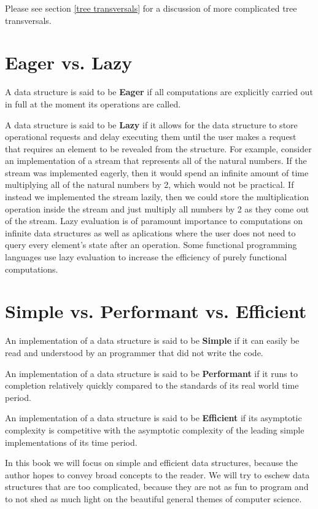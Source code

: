 \documentclass[12pt, letterpaper]{book}
\begin{document}
Please see section \ref{tree transversals} for a discussion of more complicated tree transversals.

\section{Eager vs. Lazy}

A data structure is said to be \textbf{Eager} if all computations are explicitly carried out in full at the moment its operations are called.

A data structure is said to be \textbf{Lazy} if it allows for the data structure to store operational requests and delay executing them until the user makes a request that requires an element to be revealed from the structure. For example, consider an implementation of a stream that represents all of the natural numbers. If the stream was implemented eagerly, then it would spend an infinite amount of time multiplying all of the natural numbers by 2, which would not be practical. If instead we implemented the stream lazily, then we could store the multiplication operation inside the stream and just multiply all numbers by 2 as they come out of the stream. Lazy evaluation is of paramount importance to computations on infinite data structures as well as aplications where the user does not need to query every element's state after an operation. Some functional programming languages use lazy evaluation to increase the efficiency of purely functional computations.

\section{Simple vs. Performant vs. Efficient}

An implementation of a data structure is said to be \textbf{Simple} if it can easily be read and understood by an programmer that did not write the code.

An implementation of a data structure is said to be \textbf{Performant} if it runs to completion relatively quickly compared to the standards of its real world time period.

An implementation of a data structure is said to be \textbf{Efficient} if its asymptotic complexity is competitive with the asymptotic complexity of the leading simple implementations of its time period.

In this book we will focus on simple and efficient data structures, because the author hopes to convey broad concepts to the reader. We will try to eschew data structures that are too complicated, because they are not as fun to program and to not shed as much light on the beautiful general themes of computer science.
\end{document}
